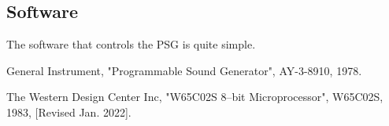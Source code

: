 \documentclass[12pt, letterpaper]{article}
\begin{document}
\subsection{Software}

The software that controls the PSG is quite simple. 

\newpage

\begin{thebibliography}{9}

General Instrument, "Programmable Sound Generator", AY-3-8910, 1978.

The Western Design Center Inc, "W65C02S 8–bit Microprocessor", W65C02S, 1983, [Revised Jan. 2022].


\end{thebibliography}
\end{document}
